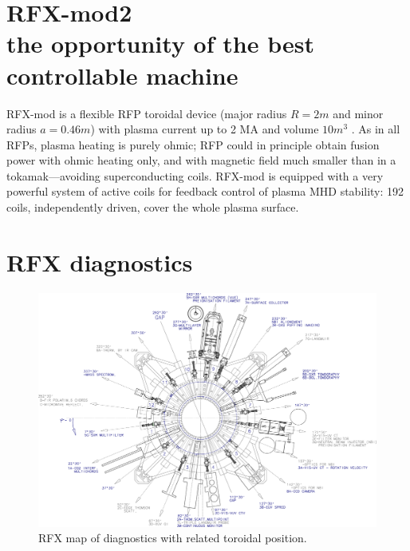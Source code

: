 \section{RFX-mod2 \\ \small{the opportunity of the best controllable machine}}
\cite{SONATO2003161}
\cite{doi:10.1063/1.4806765}
\cite{martin_RFX_overview}


RFX-mod is a flexible \ac{RFP} toroidal device (major radius $R=2 m$ and minor radius $a=0.46 m$) with plasma current up to 2 MA \cite{2MA_RFX_Current} and volume $10 m^3$ \cite{SONATO200597}. As in all RFPs, plasma heating is purely ohmic; \acl{RFP} could in principle obtain fusion power with ohmic heating only, and with magnetic field much smaller than in a tokamak—avoiding superconducting coils. RFX-mod is equipped with a very powerful system of active coils for feedback control of plasma MHD stability: 192 coils, independently driven, cover the whole plasma surface.



\section{RFX diagnostics}

%
\begin{figure}[ht!]
\includegraphics[width=1\textwidth]{img/rfx/Layout_Diagnosiche_AA10005.eps} \centering
\caption{RFX map of diagnostics with related toroidal position.}
\label{rfx}
\end{figure}
%

